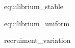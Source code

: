 
\begin{DoxyRefList}
\item[\label{test__test000001}%
\hypertarget{test__test000001}{}%
Class \hyperlink{classIOSKJ_1_1Model}{I\-O\-S\-K\-J\-:\-:Model} ]equilibrium\-\_\-stable

equilibrium\-\_\-uniform

recruiment\-\_\-variation
\end{DoxyRefList}